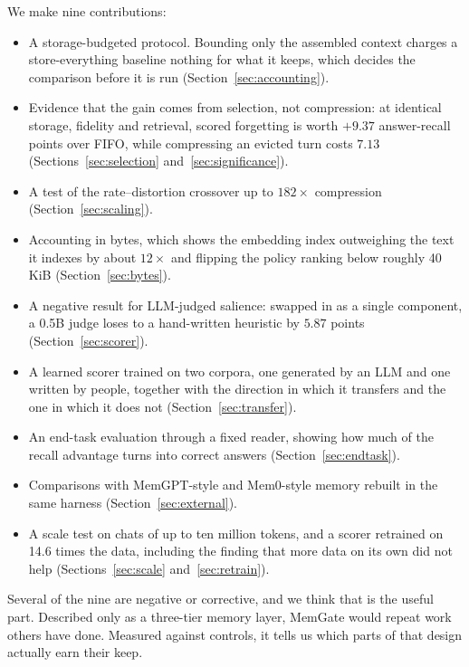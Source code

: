 We make nine contributions:
\begin{itemize}
\item A storage-budgeted protocol. Bounding only the assembled context charges
  a store-everything baseline nothing for what it keeps, which decides the
  comparison before it is run (Section~\ref{sec:accounting}).
\item Evidence that the gain comes from selection, not compression: at
  identical storage, fidelity and retrieval, scored forgetting is worth
  $+9.37$ answer-recall points over FIFO, while compressing an evicted turn
  costs $7.13$ (Sections~\ref{sec:selection} and~\ref{sec:significance}).
\item A test of the rate--distortion crossover up to $182\times$ compression
  (Section~\ref{sec:scaling}).
\item Accounting in bytes, which shows the embedding index outweighing the
  text it indexes by about $12\times$ and flipping the policy ranking below
  roughly 40\,KiB (Section~\ref{sec:bytes}).
\item A negative result for LLM-judged salience: swapped in as a single
  component, a 0.5B judge loses to a hand-written heuristic by $5.87$ points
  (Section~\ref{sec:scorer}).
\item A learned scorer trained on two corpora, one generated by an LLM and one
  written by people, together with the direction in which it transfers and the
  one in which it does not (Section~\ref{sec:transfer}).
\item An end-task evaluation through a fixed reader, showing how much of the
  recall advantage turns into correct answers (Section~\ref{sec:endtask}).
\item Comparisons with MemGPT-style and Mem0-style memory rebuilt in the same
  harness (Section~\ref{sec:external}).
\item A scale test on chats of up to ten million tokens, and a scorer
  retrained on 14.6 times the data, including the finding that more data on
  its own did not help (Sections~\ref{sec:scale} and~\ref{sec:retrain}).
\end{itemize}

Several of the nine are negative or corrective, and we think that is the useful
part. Described only as a three-tier memory layer, MemGate would repeat work
others have done. Measured against controls, it tells us which parts of that
design actually earn their keep.

